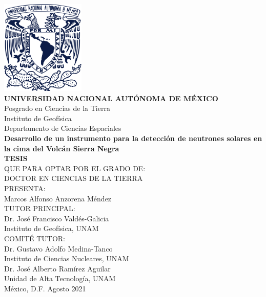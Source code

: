 \begin{titlepage}

\begin{center}

	\vspace{-1cm}
  \includegraphics[height=4.5cm]{unam.pdf}\\[20pt]
	\textbf{\Large UNIVERSIDAD NACIONAL AUTÓNOMA DE MÉXICO}\\
	\large Posgrado en Ciencias de la Tierra\\
	\large Instituto de Geofísica\\
	\large Departamento de Ciencias Espaciales\\[20pt]
	\textbf{\Large Desarrollo de un instrumento para la detección de neutrones solares en la cima
	del Volcán Sierra Negra}\\[20pt]
	\textbf{\Large TESIS}\\
  \large QUE PARA OPTAR POR EL GRADO DE:\\
  \large DOCTOR EN CIENCIAS DE LA TIERRA\\[20pt]
  \large PRESENTA:\\
	\large  Marcos Alfonso Anzorena Méndez\\[20pt]
  \large TUTOR PRINCIPAL:\\
  \large  Dr. José Francisco Valdés-Galicia\\
  \large  Instituto de Geofísica, UNAM\\[20pt]
  \large COMITÉ TUTOR:\\
  \large  Dr. Gustavo Adolfo Medina-Tanco\\
  \large  Instituto de Ciencias Nucleares, UNAM\\
  \large  Dr. José Alberto Ramírez Aguilar\\
  \large  Unidad de Alta Tecnología, UNAM\\[20pt]

  México, D.F. Agosto 2021

\end{center}



\end{titlepage}

